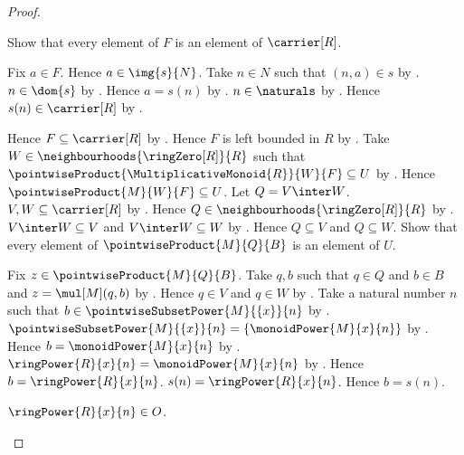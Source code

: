 \begin{proof}
\begin{subproof}
        Show that every element of $F$ is an element of $\carrier[R]$.
        \begin{subproof}
            Fix $a\in F$.
            Hence $a\in\img{s}{N}$.
            Take $n\in N$ such that $(n,a)\in s$ by .
            $n\in\dom{s}$ by .
            Hence $a=s(n)$ by .
            $n\in\naturals$ by
                .
            Hence $s(n)\in\carrier[R]$ by .
        \end{subproof}
        Hence $F\subseteq\carrier[R]$ by .
        Hence $F$ is left bounded in $R$ by
            .
        Take $W\in\neighbourhoods{\ringZero[R]}{R}$ such that
            $\pointwiseProduct{\MultiplicativeMonoid{R}}{W}{F}
                \subseteq U$ by
            .
        Hence $\pointwiseProduct{M}{W}{F}\subseteq U$.
        Let $Q=V\inter W$.
        $V,W\subseteq\carrier[R]$ by
            .
        Hence $Q\in\neighbourhoods{\ringZero[R]}{R}$ by
            .
        $V\inter W\subseteq V$ and $V\inter W\subseteq W$ by
            .
        Hence $Q\subseteq V$ and $Q\subseteq W$.
        Show that every element of $\pointwiseProduct{M}{Q}{B}$ is an
            element of $U$.
        \begin{subproof}
            Fix $z\in\pointwiseProduct{M}{Q}{B}$.
            Take $q,b$ such that $q\in Q$ and $b\in B$ and
                $z=\mul[M](q,b)$ by .
            Hence $q\in V$ and $q\in W$ by .
            Take a natural number $n$ such that
                $b\in\pointwiseSubsetPower{M}{\{x\}}{n}$ by
                .
            $\pointwiseSubsetPower{M}{\{x\}}{n}
                =\{\monoidPower{M}{x}{n}\}$ by
                .
            Hence $b=\monoidPower{M}{x}{n}$ by .
            $\ringPower{R}{x}{n}=\monoidPower{M}{x}{n}$ by
                .
            Hence $b=\ringPower{R}{x}{n}$.
            $s(n)=\ringPower{R}{x}{n}$.
            Hence $b=s(n)$.
            \begin{byCase}
                    $\ringPower{R}{x}{n}\in O$.

\end{byCase}
\end{subproof}
\end{subproof}
\end{proof}
